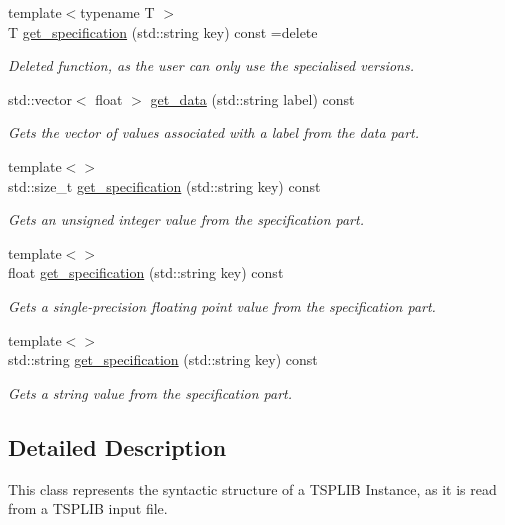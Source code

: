 \begin{DoxyCompactItemize}
{\footnotesize template$<$typename T $>$ }\\T \hyperlink{classas_1_1tsplib_1_1detail_1_1TSPLIBInput_a4af00dba4b765706aedb4bc8d90ba1dd}{get\+\_\+specification} (std\+::string key) const =delete
\begin{DoxyCompactList}\small\item\em Deleted function, as the user can only use the specialised versions. \end{DoxyCompactList}\item 
std\+::vector$<$ float $>$ \hyperlink{classas_1_1tsplib_1_1detail_1_1TSPLIBInput_ac91a185552ff34931a9a37862e03356a}{get\+\_\+data} (std\+::string label) const
\begin{DoxyCompactList}\small\item\em Gets the vector of values associated with a label from the data part. \end{DoxyCompactList}\item 
{\footnotesize template$<$$>$ }\\std\+::size\+\_\+t \hyperlink{classas_1_1tsplib_1_1detail_1_1TSPLIBInput_a89c28bafe9767d749554861b052d9b14}{get\+\_\+specification} (std\+::string key) const
\begin{DoxyCompactList}\small\item\em Gets an unsigned integer value from the specification part. \end{DoxyCompactList}\item 
{\footnotesize template$<$$>$ }\\float \hyperlink{classas_1_1tsplib_1_1detail_1_1TSPLIBInput_a58a16312cbf4297c8b6931cfc670cebb}{get\+\_\+specification} (std\+::string key) const
\begin{DoxyCompactList}\small\item\em Gets a single-\/precision floating point value from the specification part. \end{DoxyCompactList}\item 
{\footnotesize template$<$$>$ }\\std\+::string \hyperlink{classas_1_1tsplib_1_1detail_1_1TSPLIBInput_a0e7f98c294d79592b684722a2c8ac327}{get\+\_\+specification} (std\+::string key) const
\begin{DoxyCompactList}\small\item\em Gets a string value from the specification part. \end{DoxyCompactList}\end{DoxyCompactItemize}


\subsection{Detailed Description}
This class represents the syntactic structure of a T\+S\+P\+L\+IB Instance, as it is read from a T\+S\+P\+L\+IB input file. 

